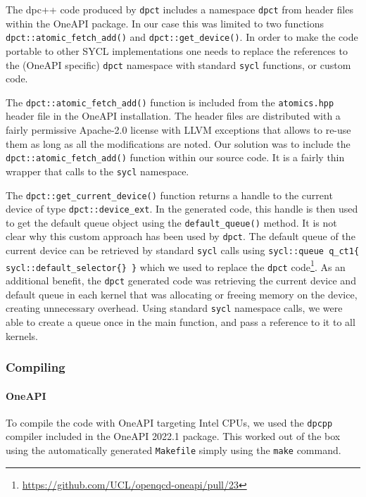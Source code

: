 \documentclass[../main]{subfiles}
\begin{document}
The dpc++ code produced by \texttt{dpct} includes a namespace \texttt{dpct} from header files within the OneAPI package.
In our case this was limited to two functions \verb!dpct::atomic_fetch_add()! and \verb!dpct::get_device()!.
In order to make the code portable to other SYCL implementations one needs to replace the references to the (OneAPI specific) \texttt{dpct} namespace with standard \texttt{sycl} functions, or custom code.

The \verb!dpct::atomic_fetch_add()! function is included from the \texttt{atomics.hpp} header file in the OneAPI installation.
The header files are distributed with a fairly permissive Apache-2.0 license with LLVM exceptions that allows to re-use them as long as all the modifications are noted.
Our solution was to include the \verb!dpct::atomic_fetch_add()! function within our source code.
It is a fairly thin wrapper that calls to the \texttt{sycl} namespace.

The \verb!dpct::get_current_device()! function returns a handle to the current device of type \verb #dpct::device_ext#.
In the generated code, this handle is then used to get the default queue object using the \verb #default_queue()# method.
It is not clear why this custom approach has been used by \texttt{dpct}.
The default queue of the current device can be retrieved by standard \texttt{sycl} calls using
\verb !sycl::queue q_ct1{ sycl::default_selector{} }!
which we used to replace the \texttt{dpct} code\footnote{\url{https://github.com/UCL/openqcd-oneapi/pull/23}}.
As an additional benefit, the \texttt{dpct} generated code was retrieving the current device and default queue in each kernel that was allocating or freeing memory on the device, creating unnecessary overhead.
Using standard \texttt{sycl} namespace calls, we were able to create a queue once in the main function, and pass a reference to it to all kernels.

\subsubsection{Compiling}\label{sec:openqcd_compiling}

\paragraph{OneAPI}

To compile the code with OneAPI targeting Intel CPUs, we used the \texttt{dpcpp} compiler included in the OneAPI 2022.1 package.
This worked out of the box using the automatically generated \texttt{Makefile} simply using the \texttt{make} command.
\end{document}
